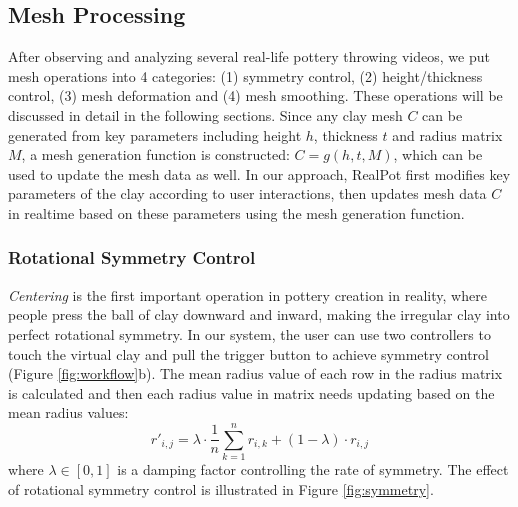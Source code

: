 \documentclass{svjour3}                     %
\begin{document}
\subsection{Mesh Processing}
\label{sec:4.2}
After observing and analyzing several real-life pottery throwing videos, we put mesh operations into 4 categories: (1) symmetry control, (2) height/thickness control, (3) mesh deformation and (4) mesh smoothing. These operations will be discussed in detail in the following sections.
Since any clay mesh $C$ can be generated from key parameters including height $h$, thickness $t$ and radius matrix $M$, a mesh generation function is constructed: $ C =  g(h, t, M) $, which can be used to update the mesh data as well.
In our approach, RealPot first modifies key parameters of the clay according to user interactions, then updates mesh data $C$  in realtime based on these parameters using the mesh generation function.

\subsubsection{Rotational Symmetry Control}
\label{sec:4.2.1}
\textit{Centering} is the first important operation in pottery creation in reality, where people press the ball of clay downward and inward, making the irregular clay into perfect rotational symmetry.
In our system, the user can use two controllers to touch the virtual clay and pull the trigger button to achieve symmetry control (Figure \ref{fig:workflow}b).
The mean radius value of each row in the radius matrix is calculated and then each radius value in matrix needs updating based on the mean radius values:
\begin{equation}
\label{eqn:sym}
r'_{i,j} = 
\lambda \cdot \frac{1}{n}\sum_{k=1}^{n} r_{i,k}
+ (1 - \lambda) \cdot r_{i,j}
\end{equation}
where $\lambda \in [0,1]$ is a damping factor controlling the rate of symmetry.
The effect of rotational symmetry control is illustrated in Figure \ref{fig:symmetry}.
\end{document}
